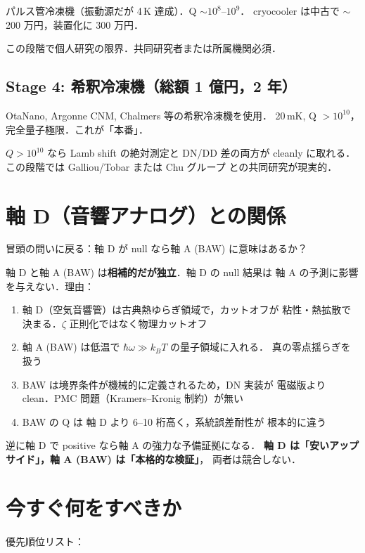 \documentclass[11pt,a4paper]{article}
\begin{document}
パルス管冷凍機（振動源だが 4\,K 達成）．Q $\sim 10^8$–$10^9$．
cryocooler は中古で $\sim$200 万円，装置化に 300 万円．

この段階で個人研究の限界．共同研究者または所属機関必須．

\subsection{Stage 4: 希釈冷凍機（総額 1 億円，2 年）}

OtaNano, Argonne CNM, Chalmers 等の希釈冷凍機を使用．
20\,mK, Q $>10^{10}$，完全量子極限．これが「本番」．

$Q > 10^{10}$ なら Lamb shift の絶対測定と DN/DD 差の両方が
cleanly に取れる．この段階では Galliou/Tobar または Chu グループ
との共同研究が現実的．

\section{軸 D（音響アナログ）との関係}

冒頭の問いに戻る：軸 D が null なら軸 A (BAW) に意味はあるか？

\begin{tcolorbox}[colback=green!5,colframe=green!50!black,title=結論]
軸 D と軸 A (BAW) は\textbf{相補的だが独立}．軸 D の null 結果は
軸 A の予測に影響を与えない．理由：
\begin{enumerate}
\item 軸 D（空気音響管）は古典熱ゆらぎ領域で，カットオフが
粘性・熱拡散で決まる．$\zeta$ 正則化ではなく物理カットオフ
\item 軸 A (BAW) は低温で $\hbar\omega \gg k_B T$ の量子領域に入れる．
真の零点揺らぎを扱う
\item BAW は境界条件が機械的に定義されるため，DN 実装が
電磁版より clean．PMC 問題（Kramers--Kronig 制約）が無い
\item BAW の Q は 軸 D より 6--10 桁高く，系統誤差耐性が
根本的に違う
\end{enumerate}
\end{tcolorbox}

逆に軸 D で positive なら軸 A の強力な予備証拠になる．
\textbf{軸 D は「安いアップサイド」，軸 A (BAW) は「本格的な検証」}，
両者は競合しない．

\section{今すぐ何をすべきか}

優先順位リスト：
\end{document}
